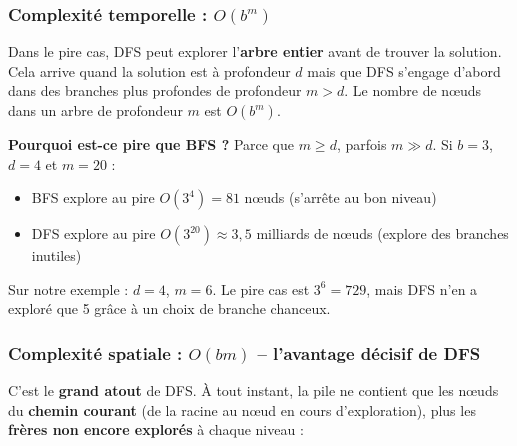 \documentclass[11pt,a4paper]{article}
\begin{document}
\subsubsection*{Complexité temporelle : $O(b^m)$}

Dans le pire cas, DFS peut explorer l'\textbf{arbre entier} avant de trouver la solution. Cela arrive quand la solution est à profondeur $d$ mais que DFS s'engage d'abord dans des branches plus profondes de profondeur $m > d$. Le nombre de nœuds dans un arbre de profondeur $m$ est $O(b^m)$.

\textbf{Pourquoi est-ce pire que BFS ?} Parce que $m \geq d$, parfois $m \gg d$. Si $b = 3$, $d = 4$ et $m = 20$ :
\begin{itemize}[nosep]
    \item BFS explore au pire $O(3^4) = 81$ nœuds (s'arrête au bon niveau)
    \item DFS explore au pire $O(3^{20}) \approx 3{,}5$ milliards de nœuds (explore des branches inutiles)
\end{itemize}

Sur notre exemple : $d = 4$, $m = 6$. Le pire cas est $3^6 = 729$, mais DFS n'en a exploré que 5 grâce à un choix de branche chanceux.

\subsubsection*{Complexité spatiale : $O(bm)$ -- l'avantage décisif de DFS}

C'est le \textbf{grand atout} de DFS. À tout instant, la pile ne contient que les nœuds du \textbf{chemin courant} (de la racine au nœud en cours d'exploration), plus les \textbf{frères non encore explorés} à chaque niveau :
\end{document}
